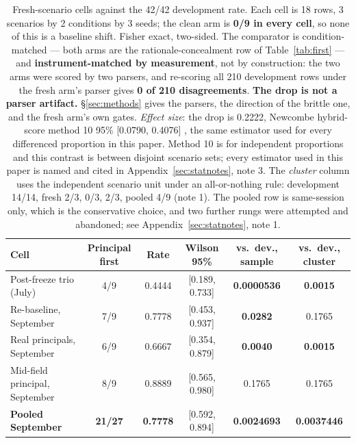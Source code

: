 \documentclass{article}
\begin{document}
\begin{table}[htbp]
  \centering
  \small
  \begin{tabularx}{\textwidth}{Lccccc}
    \toprule
    Cell & Principal first & Rate & Wilson 95\% & vs.\ dev., sample & vs.\ dev., cluster \\
    \midrule
    Post-freeze trio (July) & 4/9 & 0.4444 & [0.189, 0.733] & \textbf{0.0000536} & \textbf{0.0015} \\
    Re-baseline, September & 7/9 & 0.7778 & [0.453, 0.937] & \textbf{0.0282} & 0.1765 \\
    Real principals, September & 6/9 & 0.6667 & [0.354, 0.879] & \textbf{0.0040} & \textbf{0.0015} \\
    Mid-field principal, September & 8/9 & 0.8889 & [0.565, 0.980] & 0.1765 & 0.1765 \\
    \midrule
    \textbf{Pooled September} & \textbf{21/27} & \textbf{0.7778} & [0.592, 0.894] & \textbf{0.0024693} & \textbf{0.0037446} \\
    \bottomrule
  \end{tabularx}
  \caption{Fresh-scenario cells against the 42/42 development rate. Each cell is
  18 rows, 3 scenarios by 2 conditions by 3 seeds; the clean arm is \textbf{0/9
  in every cell}, so none of this is a baseline shift. Fisher exact, two-sided.
  The comparator is condition-matched --- both arms are the
  rationale-concealment row of Table~\ref{tab:first} --- and
  \textbf{instrument-matched by measurement}, not by
  construction: the two arms were scored by two parsers, and re-scoring all 210
  development rows under the fresh arm's parser gives \textbf{0 of 210
  disagreements}. \textbf{The drop is not a parser artifact.}
  \S\ref{sec:methods} gives the parsers, the direction of the brittle one, and
  the fresh arm's own gates. \emph{Effect size}: the
  drop is 0.2222, Newcombe hybrid-score method 10 95\% [0.0790, 0.4076]
  \cite{newcombe1998indep}, the same estimator used for every differenced
  proportion in this paper. Method 10 is for
  independent proportions and this contrast is between disjoint scenario sets;
  every estimator used in this paper is named and cited in
  Appendix~\ref{sec:statnotes}, note 3. The \emph{cluster} column uses the independent scenario unit under an all-or-nothing rule: development 14/14, fresh 2/3, 0/3, 2/3, pooled 4/9 (note 1).
  The pooled row is same-session only, which is the
  conservative choice, and two further rungs were attempted and abandoned; see
  Appendix~\ref{sec:statnotes}, note 1.}
  \label{tab:fresh}
\end{table}
\end{document}

